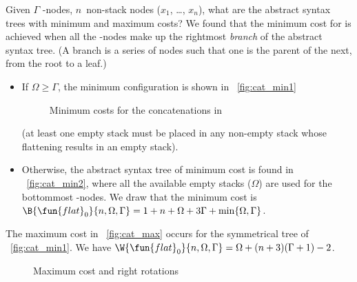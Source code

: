 Given \(\Gamma\) \hyp{}nodes, \(n\)~non\hyp{}stack nodes
(\(x_1\), \dots, \(x_n\)), what are the abstract syntax trees with
minimum and maximum costs? We found that the minimum cost for
 is achieved when all the
\hyp{}nodes make up the rightmost
\emph{branch} of the abstract syntax tree. (A
branch is a series of nodes such that one is the parent of the next,
from the root to a leaf.)
\begin{itemize}

  \item If \(\Omega \geqslant \Gamma\), the minimum configuration is
  shown in \fig~\ref{fig:cat_min1}
\begin{figure}[b]
\centering
{}
\quad
{}
\caption{Minimum costs for the concatenations in 
\label{fig:cat_min}}
\end{figure}
  (at least one empty stack must be placed in any non\hyp{}empty stack
  whose flattening results in an empty stack).

\item Otherwise, the abstract syntax tree of minimum cost is found in
  \fig~\ref{fig:cat_min2}, where all the available empty stacks
  (\(\Omega\)) are used for the bottommost \hyp{}nodes. We
  draw that the minimum cost
  is
  \(\B{\fun{flat}_0}{n,\Omega,\Gamma} = 1 + n + \Omega + 3\Gamma +
  \min\{\Omega,\Gamma\}\).

\end{itemize}

The maximum cost in
\fig~\ref{fig:cat_max} occurs for the symmetrical tree of
\fig~\ref{fig:cat_min1}. We
have
\(\W{\fun{flat}_0}{n,\Omega,\Gamma} = \Omega + (n+3)(\Gamma+1) - 2\).
\begin{figure}[t]
\centering
{}
\qquad
{}
\qquad
{}
\caption{Maximum cost and right rotations}
\end{figure}

